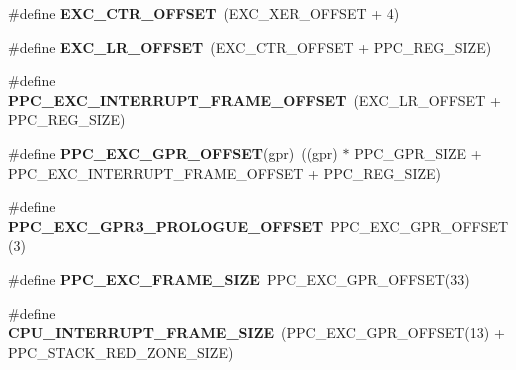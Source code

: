 \begin{DoxyCompactItemize}
\item 
\mbox{\label{group__RTEMSScoreCPUPowerPC_ga4bc0af3b75b41e1fb35f4a13da21d3d5}} 
\#define {\bfseries E\+X\+C\+\_\+\+C\+T\+R\+\_\+\+O\+F\+F\+S\+ET}~(E\+X\+C\+\_\+\+X\+E\+R\+\_\+\+O\+F\+F\+S\+ET + 4)
\item 
\mbox{\label{group__RTEMSScoreCPUPowerPC_gab63452df2f80c862deaaf6021c0f93ff}} 
\#define {\bfseries E\+X\+C\+\_\+\+L\+R\+\_\+\+O\+F\+F\+S\+ET}~(E\+X\+C\+\_\+\+C\+T\+R\+\_\+\+O\+F\+F\+S\+ET + P\+P\+C\+\_\+\+R\+E\+G\+\_\+\+S\+I\+ZE)
\item 
\mbox{\label{group__RTEMSScoreCPUPowerPC_ga37dff2181e684acb39b064b0a6759938}} 
\#define {\bfseries P\+P\+C\+\_\+\+E\+X\+C\+\_\+\+I\+N\+T\+E\+R\+R\+U\+P\+T\+\_\+\+F\+R\+A\+M\+E\+\_\+\+O\+F\+F\+S\+ET}~(E\+X\+C\+\_\+\+L\+R\+\_\+\+O\+F\+F\+S\+ET + P\+P\+C\+\_\+\+R\+E\+G\+\_\+\+S\+I\+ZE)
\item 
\mbox{\label{group__RTEMSScoreCPUPowerPC_ga05c038c4eb330108d5963db8180a1fa9}} 
\#define {\bfseries P\+P\+C\+\_\+\+E\+X\+C\+\_\+\+G\+P\+R\+\_\+\+O\+F\+F\+S\+ET}(gpr)~((gpr) $\ast$ P\+P\+C\+\_\+\+G\+P\+R\+\_\+\+S\+I\+ZE + P\+P\+C\+\_\+\+E\+X\+C\+\_\+\+I\+N\+T\+E\+R\+R\+U\+P\+T\+\_\+\+F\+R\+A\+M\+E\+\_\+\+O\+F\+F\+S\+ET + P\+P\+C\+\_\+\+R\+E\+G\+\_\+\+S\+I\+ZE)
\item 
\mbox{\label{group__RTEMSScoreCPUPowerPC_gae9e0b60b516222a529e82439833702d9}} 
\#define {\bfseries P\+P\+C\+\_\+\+E\+X\+C\+\_\+\+G\+P\+R3\+\_\+\+P\+R\+O\+L\+O\+G\+U\+E\+\_\+\+O\+F\+F\+S\+ET}~P\+P\+C\+\_\+\+E\+X\+C\+\_\+\+G\+P\+R\+\_\+\+O\+F\+F\+S\+ET(3)
\item 
\mbox{\label{group__RTEMSScoreCPUPowerPC_ga4b4a1a92332582b99409c71b3ed1e626}} 
\#define {\bfseries P\+P\+C\+\_\+\+E\+X\+C\+\_\+\+F\+R\+A\+M\+E\+\_\+\+S\+I\+ZE}~P\+P\+C\+\_\+\+E\+X\+C\+\_\+\+G\+P\+R\+\_\+\+O\+F\+F\+S\+ET(33)
\item 
\mbox{\label{group__RTEMSScoreCPUPowerPC_gac17ddadf3ff0907a3beefb6d72b1563f}} 
\#define {\bfseries C\+P\+U\+\_\+\+I\+N\+T\+E\+R\+R\+U\+P\+T\+\_\+\+F\+R\+A\+M\+E\+\_\+\+S\+I\+ZE}~(P\+P\+C\+\_\+\+E\+X\+C\+\_\+\+G\+P\+R\+\_\+\+O\+F\+F\+S\+ET(13) + P\+P\+C\+\_\+\+S\+T\+A\+C\+K\+\_\+\+R\+E\+D\+\_\+\+Z\+O\+N\+E\+\_\+\+S\+I\+ZE)

\end{DoxyCompactItemize}
